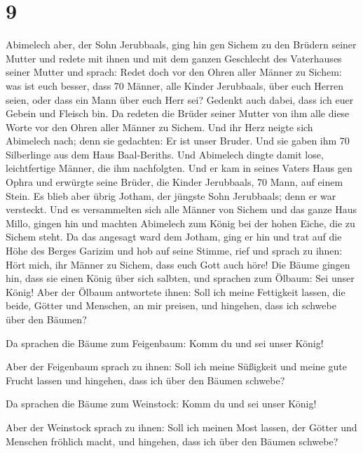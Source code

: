 \hypertarget{section-8}{%
\section{9}\label{section-8}}

 Abimelech aber, der Sohn Jerubbaals, ging hin gen Sichem
zu den Brüdern seiner Mutter und redete mit ihnen und mit dem ganzen
Geschlecht des Vaterhauses seiner Mutter und sprach: 
Redet doch vor den Ohren aller Männer zu Sichem: was ist euch besser,
dass 70 Männer, alle Kinder Jerubbaals, über euch Herren seien, oder
dass ein Mann über euch Herr sei? Gedenkt auch dabei, dass ich euer
Gebein und Fleisch bin.  Da redeten die Brüder seiner
Mutter von ihm alle diese Worte vor den Ohren aller Männer zu Sichem.
Und ihr Herz neigte sich Abimelech nach; denn sie gedachten: Er ist
unser Bruder.  Und sie gaben ihm 70 Silberlinge aus dem
Haus Baal-Beriths. Und Abimelech dingte damit lose, leichtfertige
Männer, die ihm nachfolgten.  Und er kam in seines Vaters
Haus gen Ophra und erwürgte seine Brüder, die Kinder Jerubbaals, 70
Mann, auf einem Stein. Es blieb aber übrig Jotham, der jüngste Sohn
Jerubbaals; denn er war versteckt.  Und es versammelten
sich alle Männer von Sichem und das ganze Haus Millo, gingen hin und
machten Abimelech zum König bei der hohen Eiche, die zu Sichem steht.
 Da das angesagt ward dem Jotham, ging er hin und trat auf
die Höhe des Berges Garizim und hob auf seine Stimme, rief und sprach zu
ihnen: Hört mich, ihr Männer zu Sichem, dass euch Gott auch höre!
 Die Bäume gingen hin, dass sie einen König über sich
salbten, und sprachen zum Ölbaum: Sei unser König!  Aber
der Ölbaum antwortete ihnen: Soll ich meine Fettigkeit lassen, die
beide, Götter und Menschen, an mir preisen, und hingehen, dass ich
schwebe über den Bäumen?

 Da sprachen die Bäume zum Feigenbaum: Komm du und sei
unser König!

 Aber der Feigenbaum sprach zu ihnen: Soll ich meine
Süßigkeit und meine gute Frucht lassen und hingehen, dass ich über den
Bäumen schwebe?

 Da sprachen die Bäume zum Weinstock: Komm du und sei
unser König!

 Aber der Weinstock sprach zu ihnen: Soll ich meinen Most
lassen, der Götter und Menschen fröhlich macht, und hingehen, dass ich
über den Bäumen schwebe?

